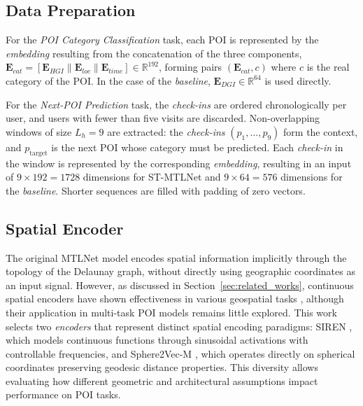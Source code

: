 \subsection{Data Preparation}

For the \textit{POI Category Classification} task, each POI is represented by the \textit{embedding} resulting from the concatenation of the three components, $\mathbf{E}_{cat} = [\mathbf{E}_{HGI} \| \mathbf{E}_{loc} \| \mathbf{E}_{time}] \in \mathbb{R}^{192}$, forming pairs $(\mathbf{E}_{cat}, c)$ where $c$ is the real category of the POI. In the case of the \textit{baseline}, $\mathbf{E}_{DGI} \in \mathbb{R}^{64}$ is used directly.

For the \textit{Next-POI Prediction} task, the \textit{check-ins} are ordered chronologically per user, and users with fewer than five visits are discarded. Non-overlapping windows of size $L_h = 9$ are extracted: the \textit{check-ins} $(p_1, \dots, p_9)$ form the context, and $p_{\text{target}}$ is the next POI whose category must be predicted. Each \textit{check-in} in the window is represented by the corresponding \textit{embedding}, resulting in an input of $9 \times 192 = 1728$ dimensions for ST-MTLNet and $9 \times 64 = 576$ dimensions for the \textit{baseline}. Shorter sequences are filled with padding of zero vectors.

\subsection{Spatial Encoder}

The original MTLNet model encodes spatial information implicitly through the topology of the Delaunay graph, without directly using geographic coordinates as an input signal. However, as discussed in Section~\ref{sec:related_works}, continuous spatial encoders have shown effectiveness in various geospatial tasks \cite{wu2024torchspatial}, although their application in multi-task POI models remains little explored. This work selects two \textit{encoders} that represent distinct spatial encoding paradigms: SIREN \cite{rußwurm2024geographiclocationencodingspherical}, which models continuous functions through sinusoidal activations with controllable frequencies, and Sphere2Vec-M \cite{mai2023sphere2vecgeneralpurposelocationrepresentation}, which operates directly on spherical coordinates preserving geodesic distance properties. This diversity allows evaluating how different geometric and architectural assumptions impact performance on POI tasks.

